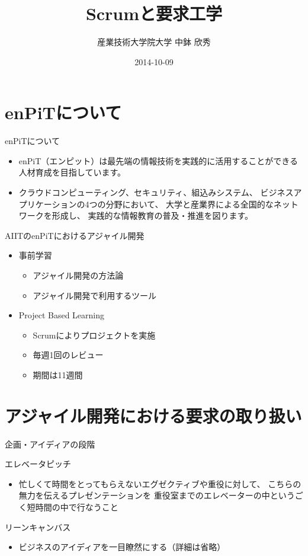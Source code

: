 \documentclass[t]{beamer}
\author{産業技術大学院大学 \linebreak 中鉢 欣秀}
\date{2014-10-09}
\title{Scrumと要求工学}
\begin{document}
\maketitle


\section{enPiTについて}
\label{sec-1}
\begin{frame}[label=sec-1-1]{enPiTについて}
\begin{itemize}
\item enPiT（エンピット）は最先端の情報技術を実践的に活用することができる
人材育成を目指しています。
\item クラウドコンピューティング、セキュリティ、組込みシステム、
ビジネスアプリケーションの4つの分野において、
大学と産業界による全国的なネットワークを形成し、
実践的な情報教育の普及・推進を図ります。
\end{itemize}
\end{frame}

\begin{frame}[label=sec-1-2]{AIITのenPiTにおけるアジャイル開発}
\begin{itemize}
\item 事前学習
\begin{itemize}
\item アジャイル開発の方法論
\item アジャイル開発で利用するツール
\end{itemize}
\item Project Based Learning
\begin{itemize}
\item Scrumによりプロジェクトを実施
\item 毎週1回のレビュー
\item 期間は11週間
\end{itemize}
\end{itemize}
\end{frame}

\section{アジャイル開発における要求の取り扱い}
\label{sec-2}
\begin{frame}[label=sec-2-1]{企画・アイディアの段階}
\begin{block}{エレベータピッチ}
\begin{itemize}
\item 忙しくて時間をとってもらえないエグゼクティブや重役に対して、
こちらの無力を伝えるプレゼンテーションを
重役室までのエレベーターの中というごく短時間の中で行なうこと
\end{itemize}
\end{block}
\begin{block}{リーンキャンバス}
\begin{itemize}
\item ビジネスのアイディアを一目瞭然にする（詳細は省略）
\end{itemize}
\end{block}
\end{frame}
\end{document}
